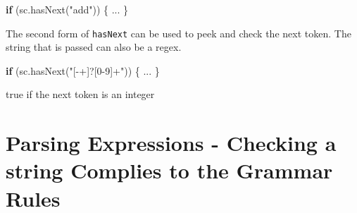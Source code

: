 \documentclass[
]{book}
\newenvironment{Shaded}{\begin{snugshade}}{\end{snugshade}}
\newcommand{\FunctionTok}[1]{\textcolor[rgb]{0.00,0.00,0.00}{#1}}
\newcommand{\KeywordTok}[1]{\textcolor[rgb]{0.13,0.29,0.53}{\textbf{#1}}}
\newcommand{\NormalTok}[1]{#1}
\newcommand{\StringTok}[1]{\textcolor[rgb]{0.31,0.60,0.02}{#1}}
\begin{document}
\begin{Shaded}
\begin{Highlighting}[]
\KeywordTok{if}\NormalTok{ (sc.}\FunctionTok{hasNext}\NormalTok{(}\StringTok{"add"}\NormalTok{)) \{}
\NormalTok{ ...}
\NormalTok{\}}
\end{Highlighting}
\end{Shaded}

The second form of \texttt{hasNext} can be used to peek and check the next token. The string that is passed can also be a regex.

\begin{Shaded}
\begin{Highlighting}[]
\KeywordTok{if}\NormalTok{ (sc.}\FunctionTok{hasNext}\NormalTok{(}\StringTok{"[{-}+]?[0{-}9]+"}\NormalTok{)) \{}
\NormalTok{ ...}
\NormalTok{\}}
\end{Highlighting}
\end{Shaded}

true if the next token is an integer

\hypertarget{parsing-expressions---checking-a-string-complies-to-the-grammar-rules}{%
\section{Parsing Expressions - Checking a string Complies to the Grammar Rules}\label{parsing-expressions---checking-a-string-complies-to-the-grammar-rules}}
\end{document}
